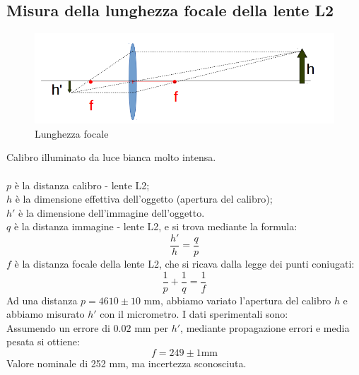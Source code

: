 \subsection{Misura della lunghezza focale della lente L2}
%
    \begin{figure}[H]
    \centering
    \includegraphics[scale=.4]{Grafici/O1_lente_focale.png}
    \caption{Lunghezza focale}
    \end{figure} 
%
%
Calibro illuminato da luce bianca molto intensa.\\\\
%
$p$ è la distanza calibro - lente L2;\\
$h$ è la dimensione effettiva dell'oggetto (apertura del calibro);\\
$h'$ è la dimensione dell'immagine dell'oggetto.\\
$q$ è la distanza immagine - lente L2, e si trova mediante la formula:
%
$$ \frac{h'}{h} = \frac{q}{p} $$
%
$f$ è la distanza focale della lente L2, che si ricava dalla legge dei punti coniugati:
$$ \frac{1}{p} + \frac{1}{q} = \frac{1}{f} $$
%
Ad una distanza $ p = 4610 \pm 10 $ mm, abbiamo variato l'apertura del calibro $h$ e abbiamo misurato $h'$ con il micrometro.
I dati sperimentali sono:\\
%

%
Assumendo un errore di $0.02$ mm per $h'$, mediante propagazione errori e media pesata si ottiene:
$$ f = 249 \pm 1 \mathrm{ mm}$$
Valore nominale di 252 mm, ma incertezza sconosciuta.



